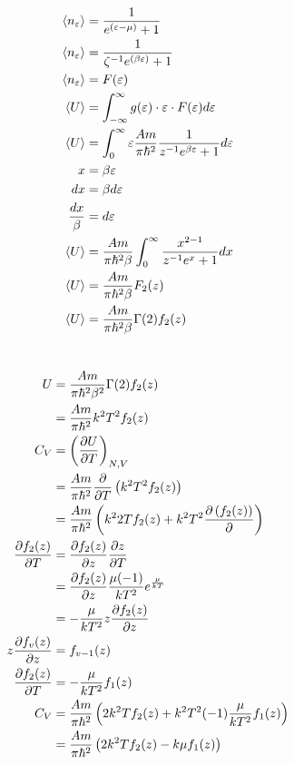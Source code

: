 \documentclass{report}
\begin{document}
\begin{align*}
  \left<n_\varepsilon\right> &= \frac{1}{e^{\left(\varepsilon - \mu\right)} + 1}\\
  \left<n_\varepsilon\right> &= \frac{1}{\zeta^{-1} e^{\left(\beta\varepsilon\right)} + 1}\\
  \left<n_\varepsilon\right> &= F(\varepsilon)\\
  \left<U\right> &= \int_{-\infty}^{\infty} g(\varepsilon)\cdot \varepsilon \cdot F(\varepsilon) d\varepsilon\\
  \left<U\right> &=\int_{0}^{\infty}\varepsilon\frac{Am}{\pi\hbar^2} \frac{1}{z^{-1}e^{\beta \varepsilon} + 1}d\varepsilon\\
  x &= \beta \varepsilon\\
  dx &= \beta d\varepsilon\\
  \frac{dx}{\beta} &= d\varepsilon\\
  \left<U\right> &= \frac{Am}{\pi\hbar^2\beta} \int_{0}^{\infty}\frac{x^{2 - 1}}{z^{-1}e^{x} + 1}dx\\
  \left<U\right> &= \frac{Am}{\pi\hbar^2\beta} F_2(z)\\
  \left<U\right> &= \frac{Am}{\pi\hbar^2\beta} \Gamma(2)f_2(z)
\end{align*}

\section{}

\begin{align*}
  U &= \frac{Am}{\pi\hbar^2\beta^2} \Gamma(2) f_2(z)\\
  &= \frac{Am}{\pi\hbar^2}k^2T^2 f_2(z)\\
  C_V &= \left(\frac{\partial U}{\partial T}\right)_{N, V}\\
  &= \frac{Am}{\pi\hbar^2}\frac{\partial}{\partial T}\left(k^2T^2f_2(z)\right)\\
  &= \frac{Am}{\pi\hbar^2}\left(k^2 2 Tf_2(z) + k^2T^2 \frac{\partial\left(f_2(z)\right)}{\partial}\right)\\
  \frac{\partial f_2(z)}{\partial T} &= \frac{\partial f_2(z)}{\partial z}\frac{\partial z}{\partial T}\\
  &= \frac{\partial f_2(z)}{\partial z}\frac{\mu(-1)}{kT^2} e^{\frac{\mu}{kT}}\\
  &= - \frac{\mu}{kT^2}z\frac{\partial f_2(z)}{\partial z}\\
  z\frac{\partial f_v(z)}{\partial z} &= f_{v - 1}(z)\\
  \frac{\partial f_2(z)}{\partial T} &= - \frac{\mu}{kT^2}f_1(z)\\
  C_V &= \frac{Am}{\pi\hbar^2}\left(2k^2Tf_2(z) + k^2T^2(-1)\frac{\mu}{kT^2}f_1(z)\right)\\
  &= \frac{Am}{\pi\hbar^2}\left(2k^2 T f_2(z) - k\mu f_1(z)\right)
\end{align*}
\end{document}
